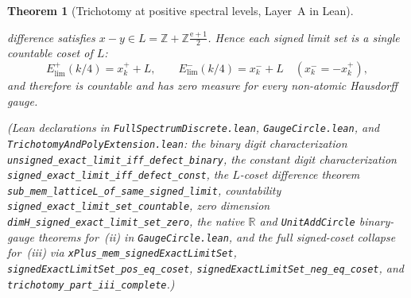\documentclass[11pt]{article}
\newtheorem{theorem}{Theorem}
\theoremstyle{definition}
\theoremstyle{remark}
\newcommand{\R}{\mathbb{R}}
\newcommand{\Z}{\mathbb{Z}}
\newcommand{\ee}{\mathrm{e}}
\begin{document}
\begin{theorem}[Trichotomy at positive spectral levels, Layer~A in Lean]
\begin{enumerate}[label=(\roman*),leftmargin=2em]
difference satisfies $x-y\in L=\Z+\Z\frac{\ee+1}{2}$. Hence each signed limit
set is a single countable coset of $L$:
\[
E_{\mathrm{lim}}^+(k/4)=x_k^+ + L,\qquad
E_{\mathrm{lim}}^-(k/4)=x_k^- + L\quad(x_k^-=-x_k^+),
\]
and therefore is countable and has zero measure for every non-atomic Hausdorff
gauge.
\end{enumerate}
(Lean declarations in \texttt{Full\allowbreak Spectrum\allowbreak Discrete.lean},
\texttt{Gauge\allowbreak Circle.lean}, and
\texttt{Trichotomy\allowbreak And\allowbreak Poly\allowbreak Extension.lean}:
the binary digit characterization \texttt{unsigned\_\allowbreak exact\_\allowbreak limit\_\allowbreak iff\_\allowbreak defect\_\allowbreak binary},
the constant digit characterization \texttt{signed\_\allowbreak exact\_\allowbreak limit\_\allowbreak iff\_\allowbreak defect\_\allowbreak const},
the $L$-coset difference theorem \texttt{sub\_\allowbreak mem\_\allowbreak latticeL\_\allowbreak of\_\allowbreak same\_\allowbreak signed\_\allowbreak limit},
countability \texttt{signed\_\allowbreak exact\_\allowbreak limit\_\allowbreak set\_\allowbreak countable},
zero dimension \texttt{dimH\_\allowbreak signed\_\allowbreak exact\_\allowbreak limit\_\allowbreak set\_\allowbreak zero},
the native $\R$ and \texttt{UnitAddCircle} binary-gauge theorems for~(ii) in \texttt{GaugeCircle.lean},
and the full signed-coset collapse for~(iii) via
\texttt{xPlus\_\allowbreak mem\_\allowbreak signed\allowbreak Exact\allowbreak LimitSet},
\texttt{signed\allowbreak Exact\allowbreak LimitSet\_\allowbreak pos\_\allowbreak eq\_\allowbreak coset},
\texttt{signed\allowbreak Exact\allowbreak LimitSet\_\allowbreak neg\_\allowbreak eq\_\allowbreak coset}, and
\texttt{trichotomy\_\allowbreak part\_\allowbreak iii\_\allowbreak complete}.)
\end{theorem}
\end{document}
